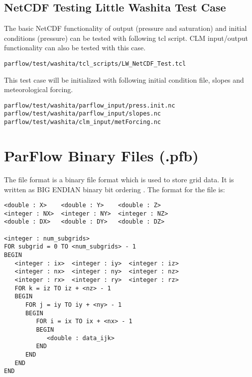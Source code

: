 \subsection{NetCDF Testing Little Washita Test Case}
The basic NetCDF functionality of output (pressure and saturation) and initial conditions (pressure) can be tested with following tcl script. CLM input/output functionality can also be tested with this case.
\begin{display}\begin{verbatim}
parflow/test/washita/tcl_scripts/LW_NetCDF_Test.tcl
\end{verbatim}\end{display}
This test case will be initialized with following initial condition file, slopes and meteorological forcing.
\begin{display}\begin{verbatim}
parflow/test/washita/parflow_input/press.init.nc
parflow/test/washita/parflow_input/slopes.nc
parflow/test/washita/clm_input/metForcing.nc
\end{verbatim}\end{display}

\section{ParFlow Binary Files (.pfb)}
\label{ParFlow Binary Files (.pfb)}

The  file format is a binary file format which is used
to store \parflow{} grid data.  It is written as BIG ENDIAN binary bit ordering \cite{endian}.
The format for the file is:

\begin{display}\begin{verbatim}
<double : X>    <double : Y>    <double : Z>
<integer : NX>  <integer : NY>  <integer : NZ>
<double : DX>   <double : DY>   <double : DZ>

<integer : num_subgrids>
FOR subgrid = 0 TO <num_subgrids> - 1
BEGIN
   <integer : ix>  <integer : iy>  <integer : iz>
   <integer : nx>  <integer : ny>  <integer : nz>
   <integer : rx>  <integer : ry>  <integer : rz>
   FOR k = iz TO iz + <nz> - 1
   BEGIN
      FOR j = iy TO iy + <ny> - 1
      BEGIN
         FOR i = ix TO ix + <nx> - 1
         BEGIN
            <double : data_ijk>
         END
      END
   END
END
\end{verbatim}\end{display}

